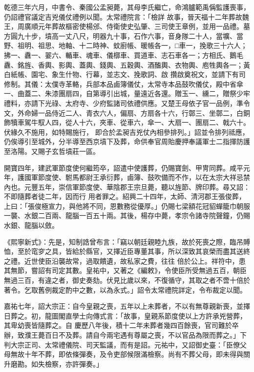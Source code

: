 \begin{pinyinscope}
 乾德三年六月，中書令、秦國公孟昶薨，其母李氏繼亡，命鴻臚範禹偁監護喪事，仍詔禮官議定吉兇儀仗禮例以聞。太常禮院言：「檢詳
 故事，晉天福十二年葬故魏王，周廣順元年葬故樞密使楊邠、侍衛使史弘肇、三司使王章例，並用一品禮。墓方圓九十步，墳高一丈八尺，明器九十事，石作六事，音身隊二十人，當壙、當野、祖明、祖思、地軸、十二時神、蚊廚帳、暖帳各一，□車一，挽歌三十六人；拂一、纛一、翣六、輴車、魂車、儀槨車、買道車、志石車各一；方相氏、鵝毛纛、銘旌、香輿、影輿、蓋輿、錢輿、五穀輿、酒醢輿、衣物輿、庖牲輿各一；黃白紙帳、園宅、象生什物、行幕，並志文、挽歌詞、啟
 攢啟奠祝文，並請下有司修制。其儀：太僕寺革輅，兵部本品鹵簿儀仗，太常寺本品鼓吹儀仗，殿中省傘一、曲蓋二、朱漆團扇四，自第導引出城，量遠近各還。贈玉一、纁二，贈祭少牢禮料，亦請下光祿、太府寺、少府監諸司依禮供應。又楚王母依子官一品例，準令文，外命婦一品侍近二人、青衣六人，偏扇、方扇各十六，行鄣三、坐鄣二，白銅飾犢車駕牛馭人四，從人十六，夾車、從車六，傘一、大扇一、團扇二、戟六十。伏緣久不施用，如特賜施行，
 即合於孟昶吉兇仗內相參排列。」詔並令排列祗應，仍俟導引至城外，分半導至西京墳下及葬，命供奉官周貽慶押奉議軍士二指揮防護至洛陽。又賜子玄哲墳莊一區。



 開寶四年，建武軍節度使何繼筠卒，詔遣中使護葬，仍賜寶劍、甲冑同葬。咸平元年，護國軍節度使、駙馬都尉王承衍葬，鹵簿、鼓吹備而不作，以在太宗大祥忌禁內也。元豐五年，崇信軍節度使、華陰郡王宗旦薨，聽以旌節、牌印葬。尋又詔：不即隨葬者徒二年，因而行
 用者罪之。紹興二十四年，太師、清河郡王張俊葬，上曰：「張俊極宣力，與他將不同，恩數務從優厚。」仍賜七梁額花冠貂蟬籠巾朝服一襲、水銀二百兩、龍腦一百五十兩。其後，楊存中薨，孝宗令諸寺院聲鐘，仍賜水銀、龍腦以斂。



 《熙寧新式》：先是，知制誥曾布言：「竊以朝廷親睦九族，故於死喪之際，臨吊賻恤，至於窀穸之具，皆給於縣官，又擇近臣專董其事，所以深致其哀榮而盡其送終之禮。近世使臣沿襲故常，過取饋遺，故私家之費，往往
 倍於公上。祥符中，患其無節，嘗詔有司定其數。皇祐中，又著之《編敕》，令使臣所受無過五百，朝臣無過三百，有違之者，御史奏劾。伏見比歲以來，不復循守，其取之者不啻十倍於著令。乞取舊例裁定酌中之數，以為永式。」詔令太常禮院詳定，令布裁定以聞。



 嘉祐七年，詔大宗正：自今皇親之喪，五年以上未葬者，不以有無尊親新喪，並擇日葬之。初，龍圖閣直學士向傳式言：「故事，皇親系節度使以上方許承兇營葬，其卑幼喪皆隨葬之。自
 慶歷八年後，積十二年未葬者幾四百餘喪，官司難於卒辦，致濮王薨百日不及葬。請自今兩宅遇有尊屬之喪，不以官品為限而葬之。」下判大宗正司、太常禮儀院、司天監議，而有是詔。元祐中，又詔御史臺：「臣僚父母無故十年不葬，即依條彈奏，及令吏部候限滿檢察。尚有不葬父母，即未得與關升磨勘。如失檢察，亦許彈奏。」




\end{pinyinscope}
